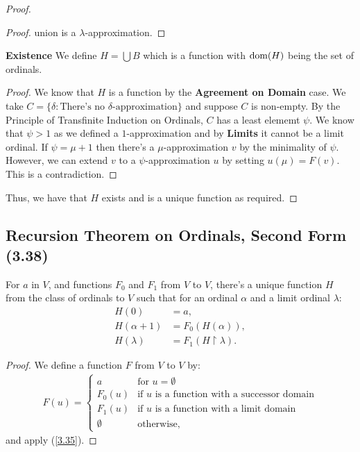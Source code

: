 \begin{proof}
\begin{proof}
        union is a $\lambda$-approximation.
    \end{proof}
    \noindent
    \textbf{Existence}
    We define $H = \bigcup B$ which is a function with $\operatorname{dom}(H)$ being the set
    of ordinals.
    \begin{proof}
        We know that $H$ is a function by the \textbf{Agreement on Domain} case.
        We take $C = \{\delta : \text{There's no $\delta$-approximation}\}$
        and suppose $C$ is non-empty. By the Principle of Transfinite Induction
        on Ordinals, $C$ has a least elememt $\psi$. We know that
        $\psi > 1$ as we defined a $1$-approximation and by \textbf{Limits}
        it cannot be a limit ordinal. If $\psi = \mu + 1$ then there's
        a $\mu$-approximation $v$ by the minimality of $\psi$. However,
        we can extend $v$ to a $\psi$-approximation $u$ by setting
        $u(\mu) = F(v)$. This is a contradiction.
    \end{proof}
    \noindent 
    Thus, we have that $H$ exists and is a unique function as required.
\end{proof}

\subsection{Recursion Theorem on Ordinals, Second Form (3.38)} \label{3.38}

For $a$ in $V$, and functions $F_0$ and $F_1$ from $V$ to $V$, there's a unique
function $H$ from the class of ordinals to $V$ such that for an ordinal $\alpha$
and a limit ordinal $\lambda$: \begin{align*}
    H(0) &= a, \\
    H(\alpha + 1) &= F_0(H(\alpha)), \\
    H(\lambda) &= F_1(H \upharpoonright \lambda).
\end{align*}

\begin{proof}
    We define a function $F$ from $V$ to $V$ by: \begin{align*}
        F(u) = \begin{cases}
            a & \text{for } u = \emptyset \\
            F_0(u) & \text{if } u \text{ is a function with a successor domain} \\
            F_1(u) & \text{if } u \text{ is a function with a limit domain} \\
            \emptyset & \text{otherwise},
        \end{cases}
    \end{align*} and apply (\ref{3.35}).
\end{proof}

